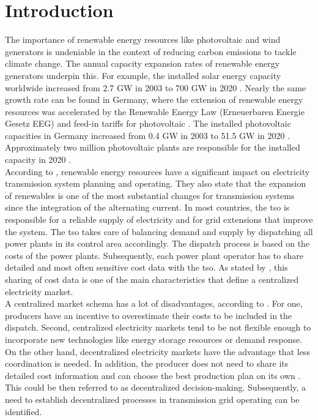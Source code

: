 \section{Introduction}
\label{sec:intro}

The importance of renewable energy resources like photovoltaic and wind generators is undeniable in the context of reducing carbon emissions to tackle climate change. The annual capacity expansion rates of renewable energy generators underpin this. For example, the installed solar energy capacity worldwide increased from 2.7 GW in 2003 to 700 GW in 2020 \citep{ritchie2020}. Nearly the same growth rate can be found in Germany, where the extension of renewable energy resources was accelerated by the Renewable Energy Law (Erneuerbaren Energie Gesetz EEG) and feed-in tariffs for photovoltaic \citep{pesch2014}. The installed photovoltaic capacities in Germany increased from 0.4 GW in 2003 to 51.5 GW in 2020 \citep{bundesnetzagentur2021}. Approximately two million photovoltaic plants are responsible for the installed capacity in 2020 \citep{bundesnetzagentur2021}.\\

According to \citet{quint2019}, renewable energy resources have a significant impact on electricity transmission system planning and operating. They also state that the expansion of renewables is one of the most substantial changes for transmission systems since the integration of the alternating current. In most countries, the \gls{tso} is responsible for a reliable supply of electricity and for grid extensions that improve the system. The \gls{tso} takes care of balancing demand and supply by dispatching all power plants in its control area accordingly. The dispatch process is based on the costs of the power plants. Subsequently, each power plant operator has to share detailed and most often sensitive cost data with the \gls{tso}. As stated by \citet{ahlqvist2022}, this sharing of cost data is one of the main characteristics that define a centralized electricity market. \\

A centralized market schema has a lot of disadvantages, according to \citet{ahlqvist2022}. For one, producers have an incentive to overestimate their costs to be included in the dispatch. Second, centralized electricity markets tend to be not flexible enough to incorporate new technologies like energy storage resources or demand response. On the other hand, decentralized electricity markets have the advantage that less coordination is needed. In addition, the producer does not need to share its detailed cost information and can choose the best production plan on its own \citep{ahlqvist2022}. This could be then referred to as decentralized decision-making. Subsequently, a need to establish decentralized processes in transmission grid operating can be identified. \\

